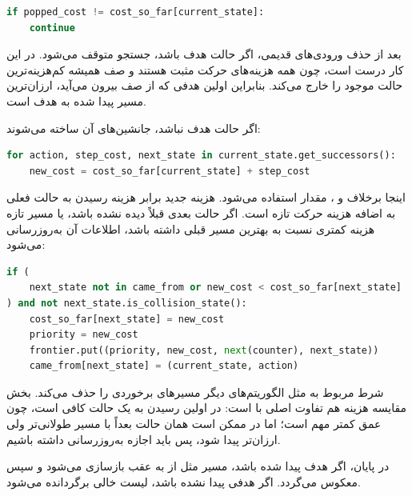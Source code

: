 \documentclass[10.5pt]{exam}
\begin{document}
\begin{latin}
\begin{lstlisting}[language=Python]
if popped_cost != cost_so_far[current_state]:
    continue
\end{lstlisting}
\end{latin}

بعد از حذف ورودی‌های قدیمی، اگر حالت هدف باشد، جستجو متوقف می‌شود. در
این کار درست است، چون همه هزینه‌های حرکت مثبت هستند و صف همیشه کم‌هزینه‌ترین حالت موجود را خارج می‌کند. بنابراین اولین هدفی که از صف بیرون می‌آید، ارزان‌ترین مسیر پیدا شده به هدف است.

اگر حالت هدف نباشد، جانشین‌های آن ساخته می‌شوند:

\begin{latin}
\begin{lstlisting}[language=Python]
for action, step_cost, next_state in current_state.get_successors():
    new_cost = cost_so_far[current_state] + step_cost
\end{lstlisting}
\end{latin}

اینجا برخلاف
و
، مقدار
استفاده می‌شود. هزینه جدید برابر هزینه رسیدن به حالت فعلی به اضافه هزینه حرکت تازه است. اگر حالت بعدی قبلاً دیده نشده باشد، یا مسیر تازه هزینه کمتری نسبت به بهترین مسیر قبلی داشته باشد، اطلاعات آن به‌روزرسانی می‌شود:

\begin{latin}
\begin{lstlisting}[language=Python]
if (
    next_state not in came_from or new_cost < cost_so_far[next_state]
) and not next_state.is_collision_state():
    cost_so_far[next_state] = new_cost
    priority = new_cost
    frontier.put((priority, new_cost, next(counter), next_state))
    came_from[next_state] = (current_state, action)
\end{lstlisting}
\end{latin}

شرط مربوط به
مثل الگوریتم‌های دیگر مسیرهای برخوردی را حذف می‌کند. بخش مقایسه هزینه هم تفاوت اصلی
با
است: در
اولین رسیدن به یک حالت کافی است، چون عمق کمتر مهم است؛ اما در
ممکن است همان حالت بعداً با مسیر طولانی‌تر ولی ارزان‌تر پیدا شود، پس باید اجازه به‌روزرسانی داشته باشیم.

در پایان، اگر هدف پیدا شده باشد، مسیر مثل
از
به عقب بازسازی می‌شود و سپس معکوس می‌گردد. اگر هدفی پیدا نشده باشد، لیست خالی برگردانده می‌شود.
\end{document}
